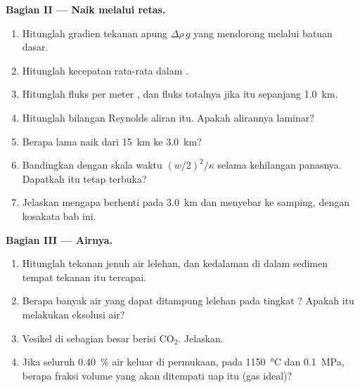 \begin{problem}
\noindent\textbf{Bagian II --- Naik melalui retas.}
\begin{enumerate}[resume]
\item Hitunglah gradien tekanan apung $\Delta\rho\,g$ yang mendorong 
melalui batuan dasar.
\item Hitunglah kecepatan rata-rata  dalam .
\item Hitunglah fluks per meter , dan fluks totalnya jika  itu
sepanjang \qty{1.0}{km}.
\item Hitunglah bilangan Reynolds aliran itu. Apakah alirannya laminar?
\item Berapa lama  naik dari \qty{15}{km} ke \qty{3.0}{km}?
\item Bandingkan dengan skala waktu $(w/2)^2/\kappa$ selama  kehilangan
panasnya. Dapatkah  itu tetap terbuka?
\item Jelaskan mengapa  berhenti pada \qty{3.0}{km} dan menyebar ke samping, dengan
kosakata bab ini.
\end{enumerate}

\noindent\textbf{Bagian III --- Airnya.}
\begin{enumerate}[resume]
\item Hitunglah tekanan jenuh air lelehan, dan kedalaman di dalam
sedimen tempat tekanan itu tercapai.
\item Berapa banyak air yang dapat ditampung lelehan pada tingkat ? Apakah  
itu melakukan eksolusi air?
\item Vesikel di   sebagian besar berisi CO$_2$. Jelaskan.
\item Jika seluruh \qty{0.40}{\percent} air keluar di permukaan, pada
\qty{1150}{\celsius} dan \qty{0.1}{MPa}, berapa fraksi volume  yang akan
ditempati uap itu (gas ideal)?
\end{enumerate}


\end{problem}
